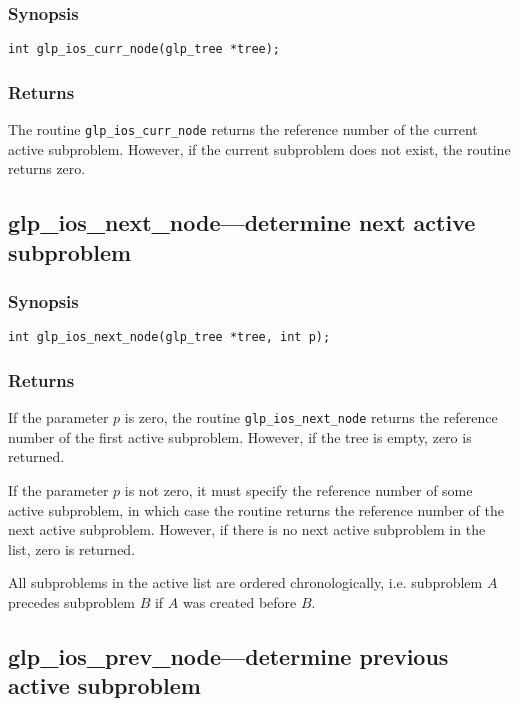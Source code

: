 \subsubsection*{Synopsis}

\begin{verbatim}
int glp_ios_curr_node(glp_tree *tree);
\end{verbatim}

\subsubsection*{Returns}

The routine \verb|glp_ios_curr_node| returns the reference number of the
current active subproblem. However, if the current subproblem does not
exist, the routine returns zero.

\newpage

\subsection{glp\_ios\_next\_node---determine next active subproblem}

\subsubsection*{Synopsis}

\begin{verbatim}
int glp_ios_next_node(glp_tree *tree, int p);
\end{verbatim}

\subsubsection*{Returns}

If the parameter $p$ is zero, the routine \verb|glp_ios_next_node|
returns the reference number of the first active subproblem. However,
if the tree is empty, zero is returned.

If the parameter $p$ is not zero, it must specify the reference number
of some active subproblem, in which case the routine returns the
reference number of the next active subproblem. However, if there is
no next active subproblem in the list, zero is returned.

All subproblems in the active list are ordered chronologically, i.e.
subproblem $A$ precedes subproblem $B$ if $A$ was created before $B$.

\subsection{glp\_ios\_prev\_node---determine previous active subproblem}


